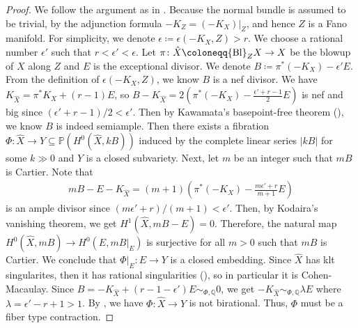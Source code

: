 \documentclass[12pt]{amsart}
\theoremstyle{definition}
\def\bl{{\rm Bl}}
\newcommand{\IP}{{\mathbb P}}
\newcommand{\IQ}{{\mathbb Q}}
\begin{document}
\begin{proof}
    We follow the argument as in \cite[Theorem 2]{LZ18}. Because the normal bundle is assumed to be trivial, by the adjunction formula $-K_Z=(-K_X)|_Z$, and hence $Z$ is a Fano manifold. 
    For simplicity, we denote $\epsilon\coloneqq \epsilon(-K_X,Z)>r$. We choose a rational number $\epsilon'$ such that $r<\epsilon'<\epsilon$. Let $\pi\colon \hat{X}\coloneqq\bl_Z X\rightarrow X$ be the blowup of $X$ along $Z$ and $E$ is the exceptional divisor. We denote $B\coloneqq \pi^*(-K_X)-\epsilon' E$. From the definition of $\epsilon(-K_X,Z)$, we know $B$ is a nef divisor. We have $K_{\hat{X}} = \pi^*K_X+(r-1)E$, so $B-K_{\hat{X}} = 2(\pi^*(-K_X)-\frac{\epsilon'+r-1}{2}E)$ is nef and big since $(\epsilon'+r-1)/2<\epsilon'$. Then by Kawamata's basepoint-free theorem (\cite[Theorem 3.3]{KM98}), we know $B$ is indeed semiample. Then there exists a fibration $\Phi\colon \hat{X}\rightarrow Y\subseteq \IP(H^0(\hat{X},kB))$ induced by the complete linear series $|kB|$ for some $k\gg 0$ and $Y$ is a closed subvariety.  Next, let $m$ be an integer such that $mB$ is Cartier. Note that 
    \begin{eqnarray*}
        mB-E-K_{\hat{X}} = (m+1)\left(\pi^*(-K_X)-\frac{m\epsilon'+r}{m+1}E\right)
    \end{eqnarray*}
    is an ample divisor since $(m\epsilon'+r)/(m+1)<\epsilon'$. Then, by Kodaira's vanishing theorem, we get $H^1(\hat{X}, mB-E)=0$. Therefore, the natural map $H^0(\hat{X}, mB)\rightarrow H^0(E,mB|_E)$ is surjective for all $m>0$ such that $mB$ is Cartier. We conclude that $\Phi|_E\colon E\rightarrow Y$ is a closed embedding. Since $\hat{X}$ has klt singularites, then it has rational singularities (\cite[Theorem 5.22]{KM98}), so in particular it is Cohen-Macaulay. Since $B=-K_{\hat{X}}+(r-1-\epsilon')E\sim_{\Phi,\IQ}0$, we get $-K_{\hat{X}}\sim_{\Phi,\IQ} \lambda E$ where $\lambda=\epsilon'-r+1>1$. By \cite[Lemma 8]{LZ18}, we have $\Phi\colon \hat{X}\rightarrow Y$ is not birational. Thus, $\Phi$ must be a fiber type contraction.
    

\end{proof}
\end{document}
